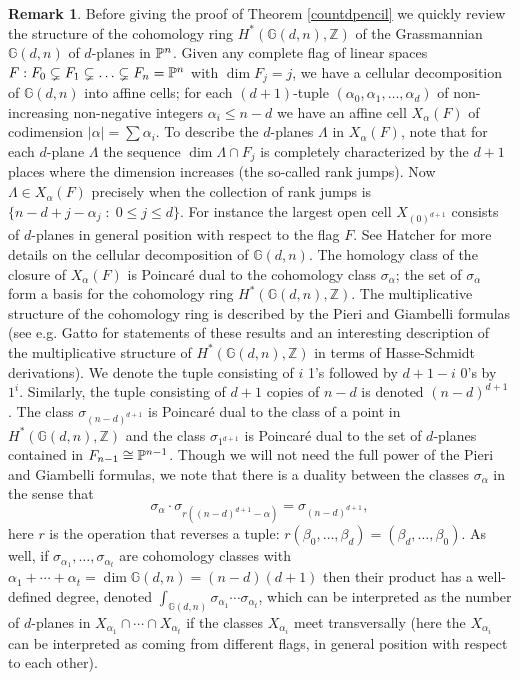 \documentclass[12pt]{article}
\theoremstyle{plain}
\theoremstyle{definition}
\newtheorem{remark}[theorem]{Remark}
\newcommand{\Z}{\mathbb{Z}}
\newcommand{\G}{\mathbb{G}}
\renewcommand{\P}{\ensuremath \mathbb{P}}
\begin{document}
\begin{remark} Before giving the proof of Theorem \ref{countdpencil} we quickly
review the structure of the cohomology ring $H^*(\G(d,n),\Z)$ of the
Grassmannian $\G(d,n)$ of $d$-planes in $\P^n$. Given any complete
flag of linear spaces $F: F_0 \subsetneq F_1 \subsetneq \ldots
\subsetneq F_{n} = \P^n$ with $\dim F_j = j$, we have a cellular
decomposition of $\G(d,n)$ into affine cells; for each $(d+1)$-tuple
$(\alpha_0, \alpha_1, \ldots, \alpha_{d})$ of
non-increasing non-negative integers $\alpha_i \leq n-d$ we have an
affine cell $X_{\alpha}(F)$ 
of codimension $| \alpha | = \sum \alpha_i$. To describe the
$d$-planes $\Lambda$ in $X_{\alpha}(F)$, note that for each $d$-plane
$\Lambda$ the sequence $\dim \Lambda \cap F_j$ is completely
characterized by the $d+1$ places where the dimension increases (the
so-called rank jumps). Now $\Lambda \in X_{\alpha}(F)$ precisely when
the collection of rank jumps is $\{n-d+j-\alpha_j \; : \; 0 \leq j \leq
d\}$. For instance the largest open cell $X_{(0)^{d+1}}$ consists of
$d$-planes in general position with respect to the flag $F$.  See
Hatcher \cite{Hatcher} for more details on the cellular decomposition
of $\G(d,n)$. The homology class of the closure of $X_\alpha(F)$ is
Poincar\'e dual to the cohomology class $\sigma_\alpha$; the set of
$\sigma_\alpha$ form a basis for the cohomology ring
$H^*(\G(d,n),\Z)$. The multiplicative structure of the cohomology ring
is described by the Pieri and Giambelli formulas (see e.g. Gatto
\cite{GattoASC,GattoIMPA} for statements of these results and an
interesting description of the multiplicative structure of
$H^*(\G(d,n),\Z)$ in terms of Hasse-Schmidt derivations). We denote
the tuple consisting of $i$ 1's followed by $d+1-i$ 0's by
$1^i$. Similarly, the tuple consisting of $d+1$ copies of $n-d$ is
denoted $(n-d)^{d+1}$. The class $\sigma_{(n-d)^{d+1}}$ is Poincar\'e
dual to the class of a point in $H^*(\G(d,n),\Z)$ and the class
$\sigma_{1^{d+1}}$ is Poincar\'e dual to the set of $d$-planes
contained in $F_{n-1} \cong \P^{n-1}$.  Though we will not need the
full power of the Pieri and Giambelli formulas, we note that there is
a duality between the classes $\sigma_\alpha$ in the sense that
$$\sigma_\alpha \cdot \sigma_{r((n-d)^{d+1}-\alpha)} =
\sigma_{(n-d)^{d+1}},$$ here $r$ is the operation that reverses a
tuple: $r(\beta_0,\ldots,\beta_{d}) =
(\beta_d,\ldots,\beta_0)$. As well, if $\sigma_{\alpha_1}, \ldots,
\sigma_{\alpha_t}$ are cohomology classes with
$\alpha_{1}+\cdots+\alpha_t = \dim \G(d,n) = (n-d)(d+1)$ then their
product has a well-defined degree, denoted $\int_{\G(d,n)}
\sigma_{\alpha_1} \cdots \sigma_{\alpha_t}$, which can be interpreted
as the number of $d$-planes in $X_{\alpha_1} \cap \cdots \cap
X_{\alpha_t}$ if the classes $X_{\alpha_i}$ meet transversally (here
the $X_{\alpha_i}$ can be interpreted as coming from different flags,
in general position with respect to each other).
\end{remark}
\end{document}
